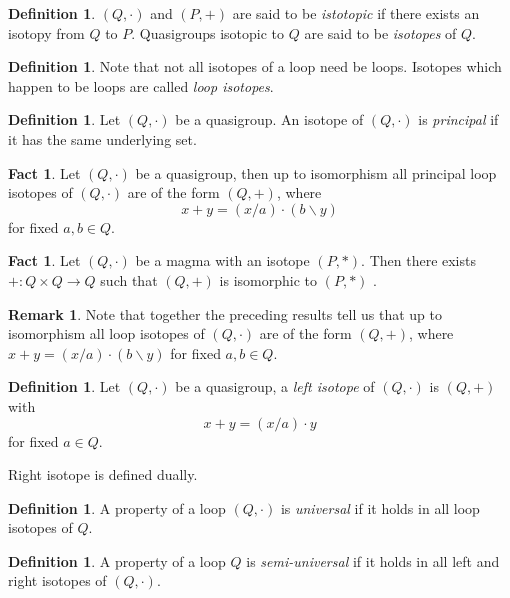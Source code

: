 \documentclass[12pt]{report}
\theoremstyle{definition}
\newtheorem{fct}[thm]{Fact}
\newtheorem{dfn}[thm]{Definition}
\newtheorem*{rmk}{Remark}
\newcommand{\ldv}{\backslash}       %
\newcommand{\rdv}{/}                %
\begin{document}
\begin{dfn}
  $(Q, \cdot)$ and $(P, +)$ are said to be \emph{istotopic} if there exists an isotopy from $Q$ to $P$. Quasigroups
    isotopic to $Q$ are said to be \emph{isotopes} of $Q$.
\end{dfn}

\begin{dfn}
  Note that not all isotopes of a loop need be loops. Isotopes which happen to be loops are called \emph{loop isotopes}.
\end{dfn}

\begin{dfn}
  Let $(Q, \cdot)$ be a quasigroup. An isotope of $(Q, \cdot)$ is \emph{principal} if it has the same underlying set.
\end{dfn}

\begin{fct}
  Let $(Q, \cdot)$ be a quasigroup, then up to isomorphism all principal loop isotopes of $(Q, \cdot)$ are of the
    form $(Q, +)$, where
  \[x + y = (x\rdv a)\cdot (b\ldv y)\]
  for fixed $a, b\in Q$\cite{Bruck}.
\end{fct}

\begin{fct}
  Let $(Q, \cdot)$ be a magma with an isotope $(P, *)$. Then there exists $+:Q\times Q\to Q$ such that $(Q, +)$ is
    isomorphic to $(P, *)$ \cite{Bruck}.
\end{fct}

\begin{rmk}
  Note that together the preceding results tell us that up to isomorphism all loop isotopes of $(Q, \cdot)$ are of the
    form $(Q, +)$, where $x + y = (x\rdv a)\cdot (b\ldv y)$ for fixed $a, b\in Q$.
\end{rmk}

\begin{dfn}
  Let $(Q, \cdot)$ be a quasigroup, a \emph{left isotope} of $(Q, \cdot)$ is $(Q, +)$ with
  \[x + y = (x\rdv a)\cdot y\]
  for fixed $a\in Q$.
\end{dfn}

Right isotope is defined dually.

\begin{dfn}
  A property of a loop $(Q, \cdot)$ is \emph{universal} if it holds in all loop isotopes of $Q$.
\end{dfn}

\begin{dfn}
  A property of a loop $Q$ is \emph{semi-universal} if it holds in all left and right isotopes of $(Q, \cdot)$.
\end{dfn}
\end{document}
